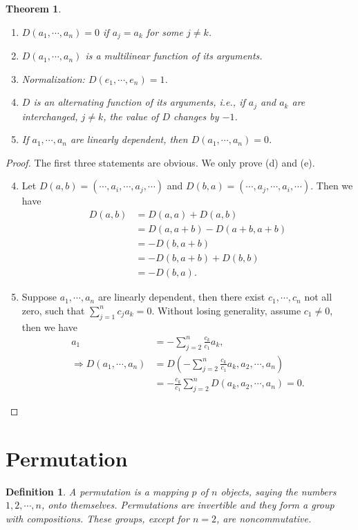 \documentclass[10pt]{book}
\newtheorem{definition}{Definition}[chapter]
\newtheorem{theorem}{Theorem}[chapter]
\theoremstyle{definition}
\numberwithin{equation}{chapter}
\begin{document}
\begin{theorem}\label{determinant}
~\begin{enumerate}[label=(\alph*)]
    \item $D(a_1,\cdots,a_n) = 0$ if $a_j = a_k$ for some $j\neq k$.
    \item $D(a_1,\cdots,a_n)$ is a multilinear function of its arguments.
    \item Normalization: $D(e_1,\cdots,e_n) = 1$.
    \item $D$ is an alternating function of its arguments, i.e., if $a_j$ and $a_k$ are interchanged, $j\neq k$, the value of $D$ changes by $-1$.
    \item If $a_1,\cdots,a_n$ are linearly dependent, then $D(a_1,\cdots,a_n) = 0$.
\end{enumerate}
\end{theorem}
\begin{proof}
The first three statements are obvious. We only prove (d) and (e).
\begin{enumerate}[label=(\alph*)]
    \setcounter{enumi}{3}
    \item Let $D(a,b) = (\cdots,a_i,\cdots,a_j,\cdots)$ and $D(b,a) = (\cdots,a_j,\cdots,a_i,\cdots)$. Then we have
    \begin{align*}
        D(a,b) & = D(a,a) + D(a,b) \\
        & = D(a,a+b) - D(a+b, a+b) \\
        & = - D(b, a+b) \\
        & = - D(b, a+b) + D(b,b)\\
        & = -D(b,a).
    \end{align*}
    \item Suppose $a_1,\cdots,a_n$ are linearly dependent, then there exist $c_1,\cdots,c_n$ not all zero, such that $\sum^n_{j=1}c_j a_k = 0$. Without losing generality, assume $c_1\neq 0$, then we have
    \begin{align*}
        a_1 & = -\sum^n_{j=2}\frac{c_k}{c_1}a_k, \\
        \Rightarrow D(a_1,\cdots,a_n) & = D\left(-\sum^n_{j=2}\frac{c_k}{c_1}a_k, a_2,\cdots,a_n\right) \\
        & = -\frac{c_k}{c_1} \sum^n_{j=2} D(a_k, a_2, \cdots, a_n) = 0.
    \end{align*}
\end{enumerate}
\end{proof}

\medskip

\section{Permutation}
\begin{definition}
A permutation is a mapping $p$ of $n$ objects, saying the numbers $1,2,\cdots,n$, onto themselves. Permutations are invertible
and they form a group with compositions. These groups, except for $n = 2$, are noncommutative.
\end{definition}
\end{document}

